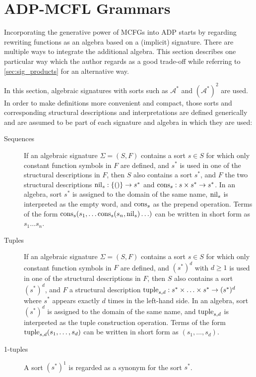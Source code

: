 \documentclass[
    a4paper,
    12pt,
    twoside,
    BCOR=12mm,
    parskip=half,
    chapterprefix,
    numbers=noenddot,
    bibliography=totoc
]{scrbook}
\begin{document}
\newpage

\section{ADP-MCFL Grammars}
\label{sec:madp_treegrammars}

Incorporating the generative power of \glspl{MCFG} into ADP starts by regarding rewriting functions as an algebra based on a (implicit) signature. There are multiple ways to integrate the additional algebra. This section describes one particular way which the author regards as a good trade-off while referring to \cref{sec:sig_products} for an alternative way.

In this section, algebraic signatures with sorts such as $\mathcal{A}^*$ and $(\mathcal{A}^*)^2$ are used. In order to make definitions more convenient and compact, those sorts and corresponding structural descriptions and interpretations are defined generically and are assumed to be part of each signature and algebra in which they are used:

\begin{description}
	\item[Sequences] If an algebraic signature $\Sigma=(S,F)$ contains a sort $s \in S$ for which only constant function symbols in $F$ are defined, and $s^*$ is used in one of the structural descriptions in $F$, then $S$ also contains a sort $s^*$, and $F$ the two structural descriptions $\mathrm{nil}_s : \{()\} \to s^*$ and $\mathrm{cons}_s : s \times s^* \to s^*$. In an algebra, sort $s^*$ is assigned to the domain of the same name, $\mathrm{nil}_s$ is interpreted as the empty word, and $\mathrm{cons}_s$ as the prepend operation. 
	Terms of the form $\mathrm{cons}_s(s_1, \ldots \mathrm{cons}_s(s_n,\mathrm{nil}_s)\ldots)$ can be written in short form as $s_1 \ldots s_n$.
	\item[Tuples] If an algebraic signature $\Sigma=(S,F)$ contains a sort $s \in S$ for which only constant function symbols in $F$ are defined, and $(s^*)^d$ with $d \geq 1$ is used in one of the structural descriptions in $F$, then $S$ also contains a sort $(s^*)^d$, and $F$ a structural description $\mathrm{tuple}_{s,d} : s^* \times \ldots \times s^* \to (s^*)^d$ where $s^*$ appears exactly $d$ times in the left-hand side. In an algebra, sort $(s^*)^d$ is assigned to the domain of the same name, and $\mathrm{tuple}_{s,d}$ is interpreted as the tuple construction operation. Terms of the form $\mathrm{tuple}_{s,d}(s_1,\ldots,s_d)$ can be written in short form as $(s_1,\ldots,s_d)$.
	\item[1-tuples] A sort $(s^*)^1$ is regarded as a synonym for the sort $s^*$.
\end{description}
\end{document}
